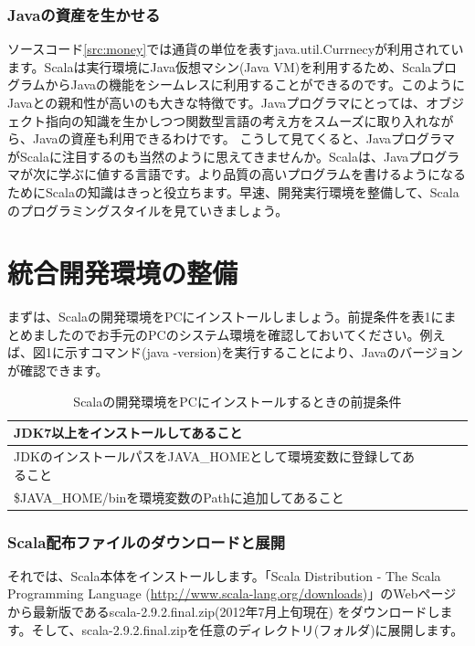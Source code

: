 \documentclass[10pt]{jarticle}
\begin{document}
\section*{Javaの資産を生かせる}
ソースコード\ref{src:money}では通貨の単位を表すjava.util.Currnecyが利用されています。Scalaは実行環境にJava仮想マシン(Java VM)を利用するため、ScalaプログラムからJavaの機能をシームレスに利用することができるのです。このようにJavaとの親和性が高いのも大きな特徴です。Javaプログラマにとっては、オブジェクト指向の知識を生かしつつ関数型言語の考え方をスムーズに取り入れながら、Javaの資産も利用できるわけです。 こうして見てくると、JavaプログラマがScalaに注目するのも当然のように思えてきませんか。Scalaは、Javaプログラマが次に学ぶに値する言語です。より品質の高いプログラムを書けるようになるためにScalaの知識はきっと役立ちます。早速、開発実行環境を整備して、Scalaのプログラミングスタイルを見ていきましょう。
\part{統合開発環境の整備}
まずは、Scalaの開発環境をPCにインストールしましょう。前提条件を表1にまとめましたのでお手元のPCのシステム環境を確認しておいてください。例えば、図1に示すコマンド(java -version)を実行することにより、Javaのバージョンが確認できます。 

\begin{table}[htb]
  \caption{Scalaの開発環境をPCにインストールするときの前提条件}
  \begin{center}
    \begin{tabular}{|l|c|r||r|} \hline
      JDK7以上をインストールしてあること\\ \hline
      JDKのインストールパスをJAVA\_HOMEとして環境変数に登録してあること\\ \hline
      \$JAVA\_HOME/binを環境変数のPathに追加してあること\\ \hline 
    \end{tabular}
  \end{center}
  \label{tb:table1}
\end{table}

\section{Scala配布ファイルのダウンロードと展開}
それでは、Scala本体をインストールします。「Scala Distribution - The Scala Programming Language (\url{http://www.scala-lang.org/downloads})」のWebページから最新版であるscala-2.9.2.final.zip(2012年7月上旬現在) をダウンロードします。そして、scala-2.9.2.final.zipを任意のディレクトリ(フォルダ)に展開します。
\end{document}
